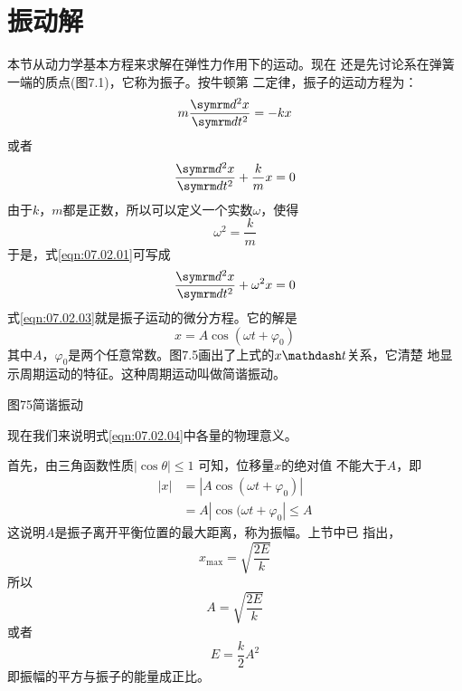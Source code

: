 \section{振动解}\label{sec:07.02}

本节从动力学基本方程来求解在弹性力作用下的运动。现在
还是先讨论系在弹簧一端的质点(图7.1)，它称为振子。按牛顿第
二定律，振子的运动方程为：
\begin{equation*}
	m \frac { \dif ^ { 2 } x } { \dif t ^ { 2 } } = - k x
\end{equation*}
或者
\begin{equation}\label{eqn:07.02.01}
	\frac { \dif ^ { 2 } x } { \dif t ^ { 2 } } + \frac { k } { m } x = 0
\end{equation}
由于$ k $，$ m $都是正数，所以可以定义一个实数$ \omega $，使得
\begin{equation}\label{eqn:07.02.02}
	\omega ^ { 2 } = \frac { k } { m }
\end{equation}
于是，式\eqref{eqn:07.02.01}可写成
\begin{equation}\label{eqn:07.02.03}
	\frac { \dif ^ { 2 } x } { \dif t ^ { 2 } } + \omega ^ { 2 } x = 0
\end{equation}
式\eqref{eqn:07.02.03}就是振子运动的微分方程。它的解是
\begin{equation}\label{eqn:07.02.04}
	x = A \cos ( \omega t + \varphi _ { 0 } )
\end{equation}
其中$ A $，$ \varphi _ { 0 } $是两个任意常数。图7.5画出了上式的$ x \mathdash t $关系，它清楚
地显示周期运动的特征。这种周期运动叫做简谐振动。

图75简谐振动

现在我们来说明式\eqref{eqn:07.02.04}中各量的物理意义。

首先，由三角函数性质$  | \cos \theta | \leqslant 1  $ 可知，位移量$ x $的绝对值
不能大于$ A $，即
\begin{equation*}
	\begin{aligned}
	| x | &= | A \cos ( \omega t + \varphi _ { 0 } ) | \\
		  &= A | \cos ( \omega t + \varphi _ { 0 } | \leqslant A
	\end{aligned}
\end{equation*}
这说明$ A $是振子离开平衡位置的最大距离，称为振幅。上节中已
指出，
\begin{equation*}
	x _ { \max } = \sqrt { \frac { 2 E } { k } }
\end{equation*}
所以
\begin{equation*}
	A = \sqrt { \frac { 2 E } { k } }
\end{equation*}
或者
\begin{equation}\label{eqn:07.02.05}
	E = \frac { k } { 2 } A ^ { 2 }
\end{equation}
即振幅的平方与振子的能量成正比。

